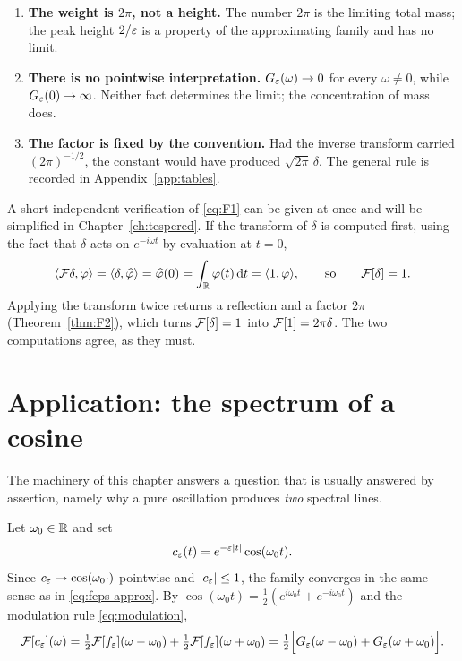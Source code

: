 \begin{remark}
\begin{enumerate}
\item \textbf{The weight is $2\pi$, not a height.} The number $2\pi$ is the limiting total mass;
the peak height $2/\varepsilon$ is a property of the approximating family and has no limit.
\item \textbf{There is no pointwise interpretation.} $G_{\varepsilon}(\omega)\to0$ for every
$\omega\neq0$, while $G_{\varepsilon}(0)\to\infty$. Neither fact determines the limit; the concentration of
mass does.
\item \textbf{The factor is fixed by the convention.} Had the inverse transform carried
$(2\pi)^{-1/2}$, the constant would have produced $\sqrt{2\pi}\,\delta$. The general rule is
recorded in Appendix~\ref{app:tables}.
\end{enumerate}
\end{remark}

A short independent verification of \eqref{eq:F1} can be given at once and will be simplified in
Chapter~\ref{ch:tespered}. If the transform of $\delta$ is computed first, using the fact that
$\delta$ acts on $e^{-i\omega t}$ by evaluation at $t=0$,
\begin{equation}
\langle \mathcal{F}\delta,\varphi\rangle=\langle \delta,\widehat{\varphi}\rangle=\widehat{\varphi}(0)=\int_{\mathbb{R}}\varphi(t)\,\mathrm{d} t=\langle 1,\varphi\rangle,
\qquad\text{so}\qquad \mathcal{F}[\delta]=1 .
\end{equation}
Applying the transform twice returns a reflection and a factor $2\pi$
(Theorem~\ref{thm:F2}), which turns $\mathcal{F}[\delta]=1$ into $\mathcal{F}[1]=2\pi\delta$. The two computations
agree, as they must.

\section{Application: the spectrum of a cosine}

The machinery of this chapter answers a question that is usually answered by assertion, namely why a
pure oscillation produces \emph{two} spectral lines.

Let $\omega_{0}\in\mathbb{R}$ and set
\begin{equation}
c_{\varepsilon}(t)=e^{-\varepsilon|t|}\cos(\omega_{0}t).
\end{equation}
Since $c_{\varepsilon}\to\cos(\omega_{0}\cdot)$ pointwise and $|c_{\varepsilon}|\le1$, the family converges in the
same sense as in \eqref{eq:feps-approx}. By
$\cos(\omega_{0}t)=\tfrac12(e^{i\omega_{0}t}+e^{-i\omega_{0}t})$ and the modulation rule
\eqref{eq:modulation},
\begin{equation}
\mathcal{F}[c_{\varepsilon}](\omega)
=\tfrac12\mathcal{F}[f_{\varepsilon}](\omega-\omega_{0})+\tfrac12\mathcal{F}[f_{\varepsilon}](\omega+\omega_{0})
=\tfrac12\Big[G_{\varepsilon}(\omega-\omega_{0})+G_{\varepsilon}(\omega+\omega_{0})\Big].
\label{eq:cos-spectrum}
\end{equation}

